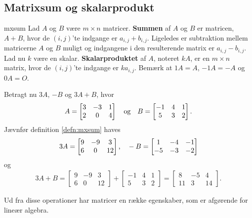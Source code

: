 \subsection{Matrixsum og skalarprodukt}
%
\begin{defn}{}{mxsum}
Lad $A$ og $B$ være $m \times n$ matricer.
\textbf{Summen} af $A$ og $B$  er matricen, $A + B$, hvor de $(i,j)$'te indgange er $a_{i,j} + b_{i,j}$.
Ligeledes er subtraktion mellem matricerne $A$ og $B$ muligt og indgangene i den resulterende matrix er $a_{i,j} - b_{i,j}$.
Lad nu $k$ være en skalar.
\textbf{Skalarproduktet} af $A$, noteret $kA$, er en $m \times n$ matrix, hvor de $(i,j)$'te indgange er $ka_{i,j}$.
Bemærk at $1A = A$, $-1A = -A$ og $0A = O$.
\end{defn}
%
\begin{eks}
Betragt nu $3A$, $-B$ og $3A+B$, hvor 
\begin{align*}
A= 
\begin{bmatrix}
3	&	-3	&	1\\
2	&	0	&	4
\end{bmatrix}
\text{\phantom{---}og\phantom{---}}
B= 
\begin{bmatrix}
-1	&	4	&	1\\
5	&	3	&	2
\end{bmatrix}.
\end{align*}
Jævnfør definition \ref{defn:mxsum} haves
\begin{align*}
3A= 
\begin{bmatrix}
9	&	-9	&	3\\
6	&	0	&	12
\end{bmatrix}
\text{,\phantom{---}}
-B= 
\begin{bmatrix}
1	&	-4	&	-1\\
-5	&	-3	&	-2
\end{bmatrix}
\end{align*}
og
\begin{align*}
3A+B= 
\begin{bmatrix}
9	&	-9	&	3\\
6	&	0	&	12
\end{bmatrix}
+ 
\begin{bmatrix}
-1	&	4	&	1\\
5	&	3	&	2
\end{bmatrix}
=
\begin{bmatrix}
8	&	-5	&	4\\
11	&	3	&	14
\end{bmatrix}.
\end{align*}
\end{eks}
%
Ud fra disse operationer har matricer en række egenskaber, som er afgørende for lineær algebra.
